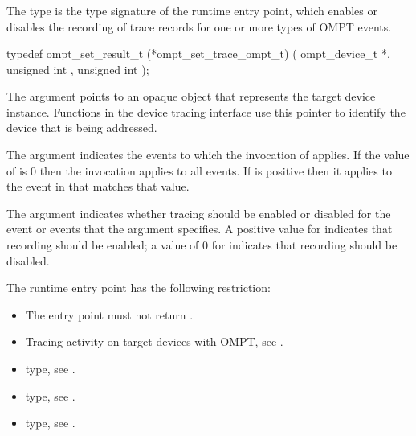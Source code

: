 \subsubsection{}
\label{sec:ompt_set_trace_ompt_t}

\summary
The  type is the type signature of the 
 runtime entry point, which enables or disables 
the recording of trace records for one or more types of OMPT events.

\format
\begin{ccppspecific}
\begin{omptInquiry}
typedef ompt_set_result_t (*ompt_set_trace_ompt_t) (
  ompt_device_t *,
  unsigned int ,
  unsigned int 
);
\end{omptInquiry}
\end{ccppspecific}

\argdesc
The  argument points to an opaque object that represents
the target device instance. Functions in the device tracing interface
use this pointer to identify the device that is being addressed.

The  argument indicates the events to which the invocation of 
 applies. If the value of  is 0 then
the invocation applies to all events. If  is positive then it applies 
to the event in  that matches that value.

The  argument indicates whether tracing should be enabled 
or disabled for the event or events that the  argument specifies. 
A positive value for  indicates that recording should be enabled; 
a value of 0 for  indicates that recording should be disabled.

\restrictions
The  runtime entry point has the following restriction:

\begin{itemize}
\item The entry point must not return .
\end{itemize}

\crossreferences
\begin{itemize}
\item Tracing activity on target devices with OMPT,
see .

\item {} type, see .

\item {} type, see .

\item {} type, see .
\end{itemize}



